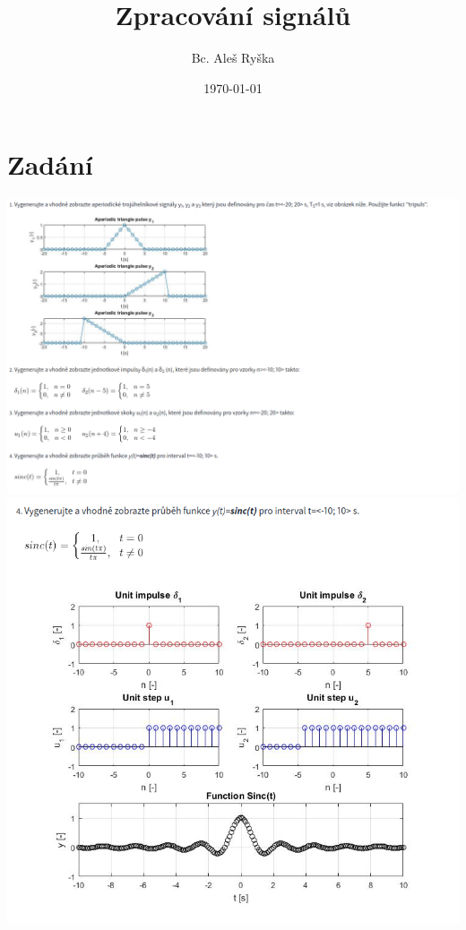 \documentclass{article}
\title{Zpracování signálů} %
\author{Bc. Aleš Ryška} %
\date{\today} %
\begin{document}
\maketitle %



\section{Zadání}
\begin{center}
\includegraphics[scale=0.45]{../assets/zadani.png}
\\
\includegraphics[scale=0.45]{../assets/zadani2.png}
\end{center}
\end{document}

